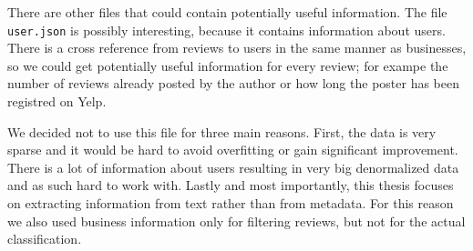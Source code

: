 There are other files that could contain potentially useful information.
The file \texttt{user.json} is possibly interesting, because it contains information about users.
There is a cross reference from reviews to users in the same manner as businesses,
so we could get potentially useful information for every review;
for exampe the number of reviews already posted by the author or
how long the poster has been registred on Yelp.

We decided not to use this file for three main reasons.
First, the data is very sparse and it would be hard to avoid overfitting or gain significant improvement.
There is a lot of information about users resulting in very big denormalized data
and as such hard to work with.
Lastly and most importantly, this thesis focuses on extracting information from text rather than from metadata.
For this reason we also used business information only for filtering reviews,
but not for the actual classification.

